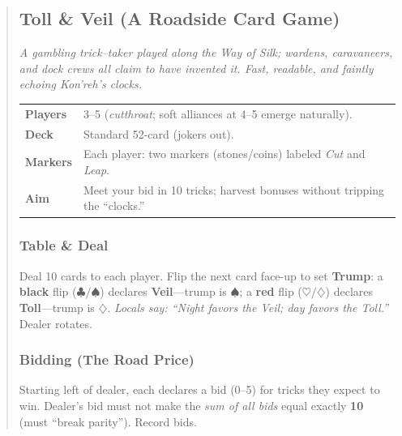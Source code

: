 \documentclass[11pt]{article}
\begin{document}
\begin{quote}
\clearpage

\subsection{Toll \& Veil (A Roadside Card Game)}
\emph{A gambling trick--taker played along the Way of Silk; wardens, caravaneers,
and dock crews all claim to have invented it. Fast, readable, and faintly
echoing Kon'reh's clocks.}

\vspace{0.25em}
\noindent\begin{tabularx}{\linewidth}{@{}>{\bfseries}l X@{}}
\toprule
Players & 3--5 (\emph{cutthroat}; soft alliances at 4--5 emerge naturally).\\
Deck & Standard 52-card (jokers out).\\
Markers & Each player: two markers (stones/coins) labeled \emph{Cut} and \emph{Leap}.\\
Aim & Meet your bid in 10 tricks; harvest bonuses without tripping the ``clocks.''\\
\bottomrule
\end{tabularx}

\subsubsection*{Table \& Deal}
Deal 10 cards to each player. Flip the next card face-up to set \textbf{Trump}:
a \textbf{black} flip ($\clubsuit/\spadesuit$) declares \textbf{Veil}---trump is $\spadesuit$;
a \textbf{red} flip ($\heartsuit/\diamondsuit$) declares \textbf{Toll}---trump is $\diamondsuit$.
\emph{Locals say: ``Night favors the Veil; day favors the Toll.''} Dealer rotates.

\subsubsection*{Bidding (The Road Price)}
Starting left of dealer, each declares a bid (0--5) for tricks they expect to win.
Dealer's bid must not make the \emph{sum of all bids} equal exactly \textbf{10} (must ``break parity''). Record bids.


\end{quote}
\end{document}
